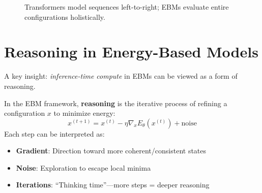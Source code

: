 \begin{figure}[h]
\centering
\caption{Transformers model sequences left-to-right; EBMs evaluate entire configurations holistically.}
\end{figure}

\section{Reasoning in Energy-Based Models}

A key insight: \emph{inference-time compute} in EBMs can be viewed as a form of reasoning.

\begin{definition}
    In the EBM framework, \textbf{reasoning} is the iterative process of refining a configuration $x$ to minimize energy:
    \[
        x^{(t+1)} = x^{(t)} - \eta \nabla_x E_\theta(x^{(t)}) + \text{noise}
    \]
    Each step can be interpreted as:
    \begin{itemize}
        \item \textbf{Gradient}: Direction toward more coherent/consistent states
        \item \textbf{Noise}: Exploration to escape local minima
        \item \textbf{Iterations}: ``Thinking time''---more steps = deeper reasoning
    \end{itemize}
\end{definition}

